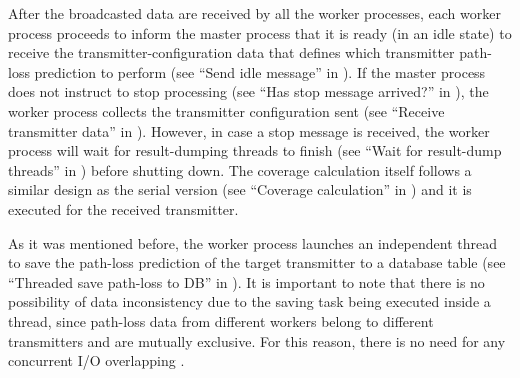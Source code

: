 After the broadcasted data are received by all the worker processes,
each worker process proceeds to inform the master process that it
is ready (in an idle state) to receive the transmitter-configuration
data that defines which transmitter path-loss prediction to perform
(see ``Send idle message'' in ).
If the master process does not instruct to stop processing (see ``Has
stop message arrived?'' in ),
the worker process collects the transmitter configuration sent (see
``Receive transmitter data'' in ).
However, in case a stop message is received, the worker process will
wait for result-dumping threads to finish (see ``Wait for result-dump
threads'' in ) before
shutting down. The coverage calculation itself follows a similar design
as the serial version (see ``Coverage calculation'' in )
and it is executed for the received transmitter.

As it was mentioned before, the worker process launches an independent
thread to save the path-loss prediction of the target transmitter
to a database table (see ``Threaded save path-loss to DB'' in ).
It is important to note that there is no possibility of data inconsistency
due to the saving task being executed inside a thread, since path-loss
data from different workers belong to different transmitters and are
mutually exclusive. For this reason, there is no need for any concurrent
I/O overlapping \cite{Liao_Scalable_design_and_implementations_for_MPI_parallel_overlapping:2006}.

